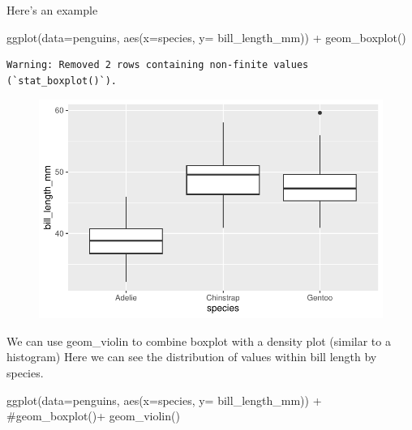 \documentclass[
  letterpaper,
  DIV=11,
  numbers=noendperiod]{scrartcl}
\newenvironment{Shaded}{\begin{snugshade}}{\end{snugshade}}
\newcommand{\AttributeTok}[1]{\textcolor[rgb]{0.40,0.45,0.13}{#1}}
\newcommand{\CommentTok}[1]{\textcolor[rgb]{0.37,0.37,0.37}{#1}}
\newcommand{\FunctionTok}[1]{\textcolor[rgb]{0.28,0.35,0.67}{#1}}
\newcommand{\NormalTok}[1]{\textcolor[rgb]{0.00,0.23,0.31}{#1}}
\newcommand{\SpecialCharTok}[1]{\textcolor[rgb]{0.37,0.37,0.37}{#1}}
\begin{document}
Here's an example

\begin{Shaded}
\begin{Highlighting}[]
\FunctionTok{ggplot}\NormalTok{(}\AttributeTok{data=}\NormalTok{penguins, }\FunctionTok{aes}\NormalTok{(}\AttributeTok{x=}\NormalTok{species, }\AttributeTok{y=}\NormalTok{ bill\_length\_mm)) }\SpecialCharTok{+}
  \FunctionTok{geom\_boxplot}\NormalTok{()}
\end{Highlighting}
\end{Shaded}

\begin{verbatim}
Warning: Removed 2 rows containing non-finite values (`stat_boxplot()`).
\end{verbatim}

\begin{figure}[H]

{\centering \includegraphics{basic_graphs_files/figure-pdf/unnamed-chunk-8-1.pdf}

}

\end{figure}

We can use geom\_violin to combine boxplot with a density plot (similar
to a histogram) Here we can see the distribution of values within bill
length by species.

\begin{Shaded}
\begin{Highlighting}[]
\FunctionTok{ggplot}\NormalTok{(}\AttributeTok{data=}\NormalTok{penguins, }\FunctionTok{aes}\NormalTok{(}\AttributeTok{x=}\NormalTok{species, }\AttributeTok{y=}\NormalTok{ bill\_length\_mm)) }\SpecialCharTok{+}
  \CommentTok{\#geom\_boxplot()+}
  \FunctionTok{geom\_violin}\NormalTok{()}
\end{Highlighting}
\end{Shaded}
\end{document}
